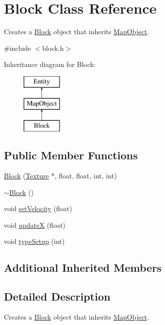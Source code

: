 \hypertarget{class_block}{\section{Block Class Reference}
\label{class_block}
}


Creates a \hyperlink{class_block}{Block} object that inherits \hyperlink{class_map_object}{Map\+Object}.  




{\ttfamily \#include $<$block.\+h$>$}

Inheritance diagram for Block\+:\begin{figure}[H]
\begin{center}
\leavevmode
\includegraphics[height=3.000000cm]{class_block}
\end{center}
\end{figure}
\subsection*{Public Member Functions}
\begin{DoxyCompactItemize}
\item 
\hyperlink{class_block_a3891a2f8968642512b5d2eeddc67131a}{Block} (\hyperlink{class_texture}{Texture} $\ast$, float, float, int, int)
\item 
\hyperlink{class_block_a19d1bd0e1cef6a865ed2745a2e648405}{$\sim$\+Block} ()
\item 
void \hyperlink{class_block_a196ba551e96906126d843bb69399a980}{set\+Velocity} (float)
\item 
void \hyperlink{class_block_a439237c91643b204336f75e5cd3721ca}{update\+X} (float)
\item 
void \hyperlink{class_block_ae46fc2f3f732a601b6599bdc8250de3f}{type\+Setup} (int)
\end{DoxyCompactItemize}
\subsection*{Additional Inherited Members}


\subsection{Detailed Description}
Creates a \hyperlink{class_block}{Block} object that inherits \hyperlink{class_map_object}{Map\+Object}. 

